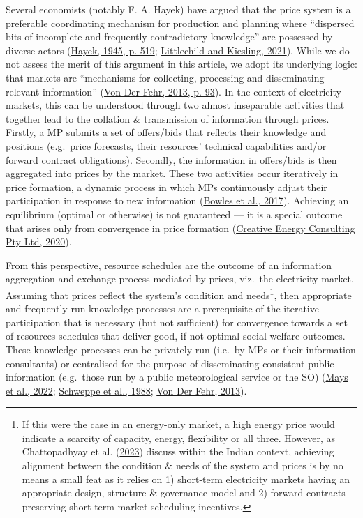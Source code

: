 \documentclass[12pt,a4paper,]{report}
\begin{document}
Several economists (notably F. A. Hayek) have argued that the price
system is a preferable coordinating mechanism for production and
planning where ``dispersed bits of incomplete and frequently
contradictory knowledge'' are possessed by diverse actors
(\protect\hyperlink{ref-hayekUseKnowledgeSociety1945}{Hayek, 1945, p.
519};
\protect\hyperlink{ref-littlechildHayekTexasBlackout2021}{Littlechild
and Kiesling, 2021}). While we do not assess the merit of this argument
in this article, we adopt its underlying logic: that markets are
``mechanisms for collecting, processing and disseminating relevant
information''
(\protect\hyperlink{ref-vonderfehrTransparencyElectricityMarkets2013}{Von
Der Fehr, 2013, p. 93}). In the context of electricity markets, this can
be understood through two almost inseparable activities that together
lead to the collation \& transmission of information through prices.
Firstly, a MP submits a set of offers/bids that reflects their knowledge
and positions (e.g.~price forecasts, their resources' technical
capabilities and/or forward contract obligations). Secondly, the
information in offers/bids is then aggregated into prices by the market.
These two activities occur iteratively in price formation, a dynamic
process in which MPs continuously adjust their participation in response
to new information
(\protect\hyperlink{ref-bowlesRetrospectivesFriedrichHayek2017}{Bowles
et al., 2017}). Achieving an equilibrium (optimal or otherwise) is not
guaranteed --- it is a special outcome that arises only from convergence
in price formation
(\protect\hyperlink{ref-creativeenergyconsultingptyltdSchedulingAheadMarkets2020}{Creative
Energy Consulting Pty Ltd, 2020}).

From this perspective, resource schedules are the outcome of an
information aggregation and exchange process mediated by prices,
viz.~the electricity market. Assuming that prices reflect the system's
condition and needs\footnote{If this were the case in an energy-only
  market, a high energy price would indicate a scarcity of capacity,
  energy, flexibility or all three. However, as Chattopadhyay et al.
  (\protect\hyperlink{ref-chattopadhyaySpotlightSpotMarket2023}{2023})
  discuss within the Indian context, achieving alignment between the
  condition \& needs of the system and prices is by no means a small
  feat as it relies on 1) short-term electricity markets having an
  appropriate design, structure \& governance model and 2) forward
  contracts preserving short-term market scheduling incentives.}, then
appropriate and frequently-run knowledge processes are a prerequisite of
the iterative participation that is necessary (but not sufficient) for
convergence towards a set of resources schedules that deliver good, if
not optimal social welfare outcomes. These knowledge processes can be
privately-run (i.e.~by MPs or their information consultants) or
centralised for the purpose of disseminating consistent public
information (e.g.~those run by a public meteorological service or the
SO) (\protect\hyperlink{ref-maysPrivateRiskSocial2022}{Mays et al.,
2022};
\protect\hyperlink{ref-schweppeSpotPricingElectricity1988}{Schweppe et
al., 1988};
\protect\hyperlink{ref-vonderfehrTransparencyElectricityMarkets2013}{Von
Der Fehr, 2013}).
\end{document}
